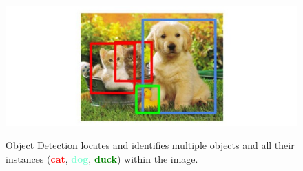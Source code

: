 \documentclass[12pt,a4paper,table,dvipsnames,tikz]{report}
\newcommand{\boldcolor}[2]{\textbf{\textcolor{#1}{#2}}}
\begin{document}
	\begin{figure}[h!]
		\caption{Object Detection locates and identifies multiple objects and all their 
		instances (\boldcolor{red}{cat}, \boldcolor{Aquamarine}{dog}, \boldcolor{green}{duck}) 
		within the image.}
		\centering
		\includegraphics[width=\textwidth]{detect}
		\label{fig:det}
	\end{figure}
	
\end{document}
